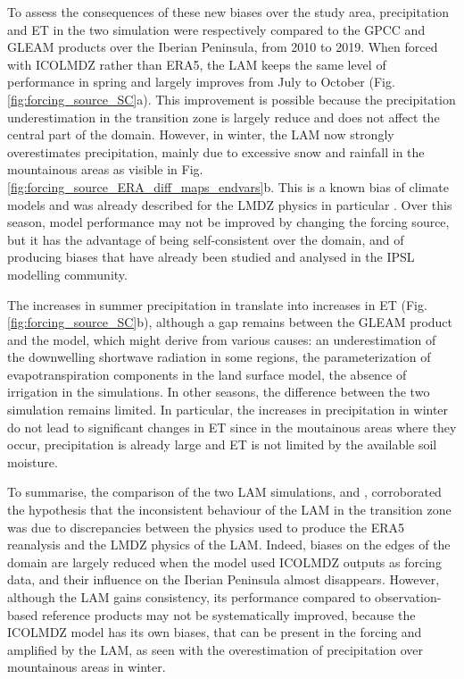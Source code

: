 To assess the consequences of these new biases over the study area, precipitation and ET in the two simulation were respectively compared to the GPCC and GLEAM products over the Iberian Peninsula, from 2010 to 2019.
When forced with ICOLMDZ rather than ERA5, the LAM keeps the same level of performance in spring and largely improves from July to October (Fig. \ref{fig:forcing_source_SC}a). This improvement is possible because the precipitation underestimation in the transition zone is largely reduce and does not affect the central part of the domain. However, in winter, the LAM now strongly overestimates precipitation, mainly due to excessive snow and rainfall in the mountainous areas as visible in Fig. \ref{fig:forcing_source_ERA_diff_maps_endvars}b. This is a known bias of climate models and was already described for the LMDZ physics in particular \citep{arjdal_modeling_2024, adhikari_evaluation_2024}. Over this season, model performance may not be improved by changing the forcing source, but it has the advantage of being self-consistent over the domain, and of producing biases that have already been studied and analysed in the IPSL modelling community.

The increases in summer precipitation in \forcingICO translate into increases in ET (Fig. \ref{fig:forcing_source_SC}b), although a gap remains between the GLEAM product and the model, which might derive from various causes: an underestimation of the downwelling shortwave radiation in some regions, the parameterization of evapotranspiration components in the land surface model, the absence of irrigation in the simulations. In other seasons, the difference between the two simulation remains limited. In particular, the increases in precipitation in winter do not lead to significant changes in ET since in the moutainous areas where they occur, precipitation is already large and ET is not limited by the available soil moisture.

\hfill

To summarise, the comparison of the two LAM simulations, \forcingERA and \forcingICO, corroborated the hypothesis that the inconsistent behaviour of the LAM in the transition zone was due to discrepancies between the physics used to produce the ERA5 reanalysis and the LMDZ physics of the LAM. Indeed, biases on the edges of the domain are largely reduced when the model used ICOLMDZ outputs as forcing data, and their influence on the Iberian Peninsula almost disappears. However, although the LAM gains consistency, its performance compared to observation-based reference products may not be systematically improved, because the ICOLMDZ model has its own biases, that can be present in the forcing and amplified by the LAM, as seen with the overestimation of precipitation over mountainous areas in winter.

